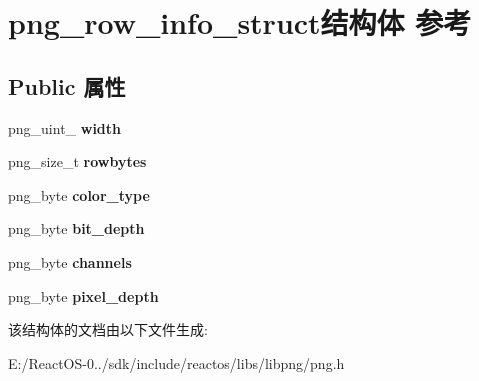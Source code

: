 \hypertarget{structpng__row__info__struct}{}\section{png\+\_\+row\+\_\+info\+\_\+struct结构体 参考}
\label{structpng__row__info__struct}
\subsection*{Public 属性}
\begin{DoxyCompactItemize}
\item 
\mbox{\label{structpng__row__info__struct_a1ab107da5ffee8100eeaa76cc5ba3e62}} 
png\+\_\+uint\+\_ {\bfseries width}
\item 
\mbox{\label{structpng__row__info__struct_a924a208653f2577c05db5e1cf3aa5817}} 
png\+\_\+size\+\_\+t {\bfseries rowbytes}
\item 
\mbox{\label{structpng__row__info__struct_a646244422549c66e6661cfcdb67c8e28}} 
png\+\_\+byte {\bfseries color\+\_\+type}
\item 
\mbox{\label{structpng__row__info__struct_a6b14d5d0cc32f151c28c568cf1c1f82d}} 
png\+\_\+byte {\bfseries bit\+\_\+depth}
\item 
\mbox{\label{structpng__row__info__struct_a7cefee70361a3789a862001aefcd872f}} 
png\+\_\+byte {\bfseries channels}
\item 
\mbox{\label{structpng__row__info__struct_a70b84917ef9eabc9b7d29ec96fd01153}} 
png\+\_\+byte {\bfseries pixel\+\_\+depth}
\end{DoxyCompactItemize}


该结构体的文档由以下文件生成\+:\begin{DoxyCompactItemize}
\item 
E\+:/\+React\+O\+S-\/0../sdk/include/reactos/libs/libpng/png.\+h\end{DoxyCompactItemize}

